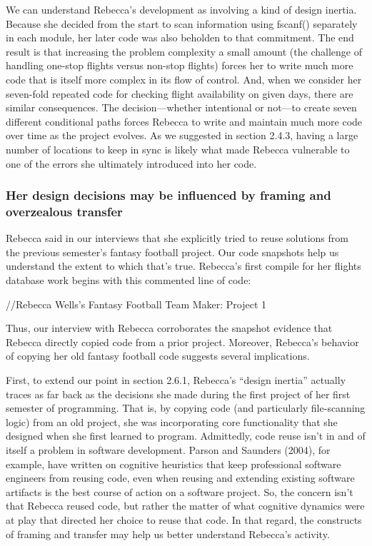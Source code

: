 We can understand Rebecca's development as involving a kind of design
inertia. Because she decided from the start to scan information using
fscanf() separately in each module, her later code was also beholden to
that commitment. The end result is that increasing the problem
complexity a small amount (the challenge of handling one-stop flights
versus non-stop flights) forces her to write much more code that is
itself more complex in its flow of control. And, when we consider her
seven-fold repeated code for checking flight availability on given days,
there are similar consequences. The decision---whether intentional or
not---to create seven different conditional paths forces Rebecca to
write and maintain much more code over time as the project evolves. As
we suggested in section 2.4.3, having a large number of locations to
keep in sync is likely what made Rebecca vulnerable to one of the errors
she ultimately introduced into her code.

\subsubsection{Her design decisions may be influenced by framing and
overzealous
transfer}\label{her-design-decisions-may-be-influenced-by-framing-and-overzealous-transfer}

Rebecca said in our interviews that she explicitly tried to reuse
solutions from the previous semester's fantasy football project. Our
code snapshots help us understand the extent to which that's true.
Rebecca's first compile for her flights database work begins with this
commented line of code:

//Rebecca Wells's Fantasy Football Team Maker: Project 1

Thus, our interview with Rebecca corroborates the snapshot evidence that
Rebecca directly copied code from a prior project. Moreover, Rebecca's
behavior of copying her old fantasy football code suggests several
implications.

First, to extend our point in section 2.6.1, Rebecca's ``design
inertia'' actually traces as far back as the decisions she made during
the first project of her first semester of programming. That is, by
copying code (and particularly file-scanning logic) from an old project,
she was incorporating core functionality that she designed when she
first learned to program. Admittedly, code reuse isn't in and of itself
a problem in software development. Parson and Saunders (2004), for
example, have written on cognitive heuristics that keep professional
software engineers from reusing code, even when reusing and extending
existing software artifacts is the best course of action on a software
project. So, the concern isn't that Rebecca reused code, but rather the
matter of what cognitive dynamics were at play that directed her choice
to reuse that code. In that regard, the constructs of framing and
transfer may help us better understand Rebecca's activity.

